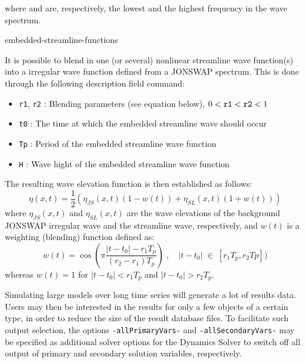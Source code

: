 \noindent
where  and  are, respectively,
the lowest and the highest frequency in the wave spectrum.


           {embedded-streamline-functions}

It is possible to blend in one (or several) nonlinear streamline wave
function(s) into a irregular wave function defined from a JONSWAP spectrum.
This is done through the following description field command:


\begin{itemize}
\item{\tt r1}, {\tt r2} :
  Blending parameters (see equation below), $0<{\tt r1}<{\tt r2}<1$
\item{\tt t0} :
  The time at which the embedded streamline wave should occur
\item{\tt Tp} :
  Period of the embedded streamline wave function
\item{\tt H} :
  Wave hight of the embedded streamline wave function
\end{itemize}

\noindent
The resulting wave elevation function is then established as follows:
$$
\eta(x,t) = \frac{1}{2}\left(\eta_{JS}(x,t)(1-w(t))+\eta_{SL}(x,t)(1+w(t))\right)
$$
where $\eta_{JS}(x,t)$ and $\eta_{SL}(x,t)$ are the wave elevations of the
background JONSWAP irregular wave and the streamline wave, respectively,
and $w(t)$ is a weighting (blending) function defined as:
$$
w(t) = \cos\left(\pi\frac{|t-t_0|-r_1 T_p}{(r_2-r_1)T_p}\right)
\;,\quad |t-t_0| \;\in\; [r_1T_p,r_2 Tp])
$$
whereas $w(t)=1$ for $|t-t_0|<r_1T_p$ and $|t-t_0|>r_2T_p$.



Simulating large models over long time series will generate a lot of
results data. Users may then be interested in the results for only a few
objects of a certain type, in order to reduce the size of the result
database files. To facilitate such output selection, the options
{\tt-allPrimaryVars-} and {\tt-allSecondaryVars-} may be specified
as additional solver options for the Dynamics Solver
 to switch off
all output of primary and secondary solution variables, respectively.

